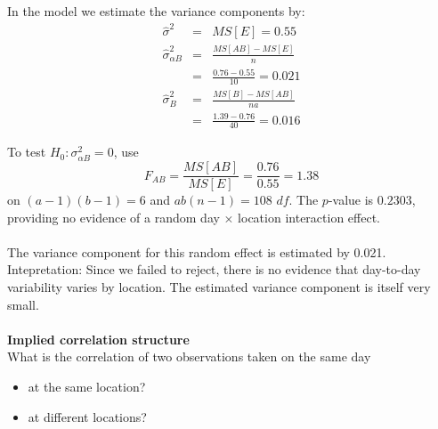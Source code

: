 In the model we estimate the variance components by:
\begin{eqnarray*}
\hat\sigma^2 & = & MS[E]  =  0.55 \\
\hat\sigma_{\alpha B}^2 & = & \frac{MS[AB]-MS[E]}{n} \\
& = & \frac{0.76-0.55}{10}  =  0.021  \\
\hat\sigma_{B}^2 & = & \frac{MS[B]-MS[AB]}{na} \\
& = & \frac{1.39-0.76}{40}  =  0.016
\end{eqnarray*}

To test $H_0: \sigma_{\alpha B}^2=0$, use 
$$F_{AB}=\frac{MS[AB]}{MS[E]}=\frac{0.76}{0.55}=1.38$$
on $(a-1)(b-1)=6$ and $ab(n-1)=108$ $df$.  The $p$-value is $0.2303$, providing no evidence of a random day $\times$ location interaction effect. \\~\\
The variance component for this random effect is estimated by 0.021.  Intepretation: Since we failed to reject, there is no evidence that day-to-day variability varies by location.  The estimated variance component is itself very small.\\~\\

\textbf{Implied correlation structure}\\
What is the correlation of two observations taken on the same day 
\begin{itemize}
\item at the same location?
\item at different locations?
\end{itemize}

